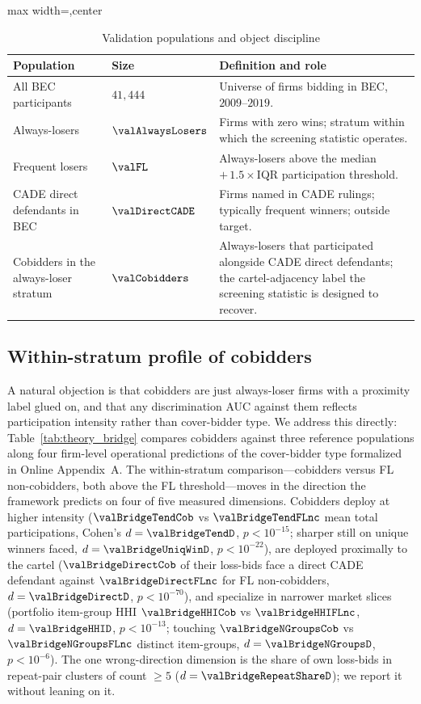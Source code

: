 \begin{table}[htbp]
\centering
\caption{Validation populations and object discipline}
\label{tab:cade_populations}
\footnotesize
\begin{adjustbox}{max width=\textwidth,center}
\begin{tabular}{p{4.0cm}p{2.0cm}p{6.5cm}}
\toprule
Population & Size & Definition and role \\
\midrule
All BEC participants & $41{,}444$ & Universe of firms bidding in BEC, $2009$--$2019$. \\
Always-losers & $\valAlwaysLosers$ & Firms with zero wins; stratum within which the screening statistic operates. \\
Frequent losers & $\valFL$ & Always-losers above the median $+\,1.5\!\times$IQR participation threshold. \\
CADE direct defendants in BEC & $\valDirectCADE$ & Firms named in CADE rulings; typically frequent winners; outside target. \\
Cobidders in the always-loser stratum & $\valCobidders$ & Always-losers that participated alongside CADE direct defendants; the cartel-adjacency label the screening statistic is designed to recover. \\
\bottomrule
\end{tabular}
\end{adjustbox}
\end{table}

\subsection{Within-stratum profile of cobidders}
\label{sec:cade_bridge}

A natural objection is that cobidders are just always-loser
firms with a proximity label glued on, and that any
discrimination AUC against them reflects participation intensity
rather than cover-bidder type. We address this directly:
Table~\ref{tab:theory_bridge} compares cobidders against three
reference populations along four firm-level operational
predictions of the cover-bidder type formalized in Online
Appendix~A. The within-stratum comparison---cobidders
versus FL non-cobidders, both above the FL threshold---moves in
the direction the framework predicts on four of five measured
dimensions. Cobidders deploy at higher intensity
($\valBridgeTendCob$ vs $\valBridgeTendFLnc$ mean total
participations, Cohen's $d=\valBridgeTendD$, $p<10^{-15}$;
sharper still on unique winners faced,
$d=\valBridgeUniqWinD$, $p<10^{-22}$), are deployed proximally
to the cartel ($\valBridgeDirectCob$ of their loss-bids face a
direct CADE defendant against $\valBridgeDirectFLnc$ for FL
non-cobidders, $d=\valBridgeDirectD$, $p<10^{-70}$), and
specialize in narrower market slices (portfolio item-group HHI
$\valBridgeHHICob$ vs $\valBridgeHHIFLnc$,
$d=\valBridgeHHID$, $p<10^{-13}$; touching $\valBridgeNGroupsCob$
vs $\valBridgeNGroupsFLnc$ distinct item-groups,
$d=\valBridgeNGroupsD$, $p<10^{-6}$). The one wrong-direction
dimension is the share of own loss-bids in repeat-pair clusters
of count $\geq 5$ ($d=\valBridgeRepeatShareD$); we report it
without leaning on it.

